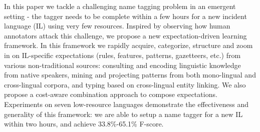 In this paper we tackle a challenging name tagging problem in an emergent setting - the tagger needs to be complete within a few hours for a new incident language (IL) using very few resources. Inspired by observing how human annotators attack this challenge, we propose a new expectation-driven learning framework. In this framework we rapidly acquire, categorize, structure and zoom in on IL-specific expectations (rules, features, patterns, gazetteers, etc.) from various non-traditional sources: consulting and encoding linguistic knowledge from native speakers, mining and projecting patterns from both mono-lingual and cross-lingual corpora, and typing based on cross-lingual entity linking. We also propose a cost-aware combination approach to compose expectations. Experiments on seven low-resource languages demonstrate the effectiveness and generality of this framework: we are able to setup a name tagger for a new IL within two hours, and achieve 33.8\%-65.1\% F-score.
